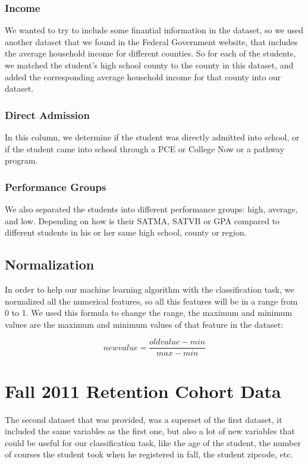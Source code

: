 \documentclass{article}
\begin{document}
\subsubsection*{Income}

We wanted to try to include some finantial information in the dataset, so we used another dataset that we found in the Federal Government website, that includes the average household income for different counties. So for each of the students, we matched the student's high school county to the county in this dataset, and added the corresponding average household income for that county into our dataset.

\subsubsection*{Direct Admission}

In this column, we determine if the student was directly admitted into school, or if the student came into school through a PCE or College Now or a pathway program.

\subsubsection*{Performance Groups}

We also separated the students into different performance groups: high, average, and low. Depending on how is their SATMA, SATVB or GPA compared to different students in his or her same high school, county or region.

\subsection*{Normalization}

In order to help our machine learning algorithm with the classification task, we normalized all the numerical features, so all this features will be in a range from 0 to 1. We used this formula to change the range, the maximum and minimum values are the maximum and minimum values of that feature in the dataset:

$$newvalue = \frac{oldvalue-min}{max-min}$$

\section*{Fall 2011 Retention Cohort Data}

The second dataset that was provided, was a superset of the first dataset, it included the same variables as the first one, but also a lot of new variables that could be useful for our classification task, like the age of the student, the number of courses the student took when he registered in fall, the student zipcode, etc.
\end{document}
